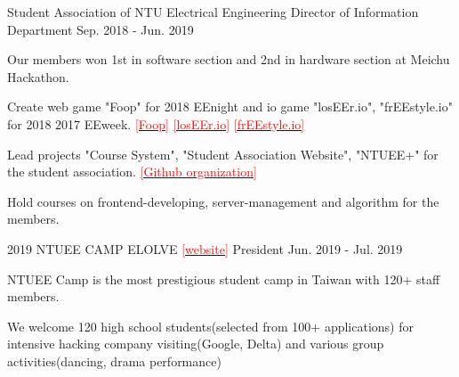 

\begin{cventries}

  \cventry
    {Student Association of NTU Electrical Engineering} %
    {Director of Information Department} %
    {} %
    {Sep. 2018 - Jun. 2019} %
    {
      \begin{cvitems} %
        \item {Our members won 1st in software section and 2nd in hardware section at Meichu Hackathon.}
        \item {Create web game "Foop" for 2018 EEnight and io game "losEEr.io", "frEEstyle.io" for 2018 2017 EEweek.} \href{https://github.com/ByronHsu/Foop}{\textcolor{red}{[Foop]}} \href{https://github.com/ByronHsu/losEEr.io}{\textcolor{red}{[losEEr.io]}} \href{https://github.com/HowardMHJuan/2017EEweek}{\textcolor{red}{[frEEstyle.io]}}
        \item {Lead projects "Course System", "Student Association Website", "NTUEE+" for the student association.} \href{https://github.com/NTUEEInfoDep}{\textcolor{red}{[Github organization]}}
        \item {Hold courses on frontend-developing, server-management and algorithm for the members.}
      \end{cvitems}
    }

  \cventry
    {2019 NTUEE CAMP ELOLVE \href{https://byronhsu.github.io/2019eecamp/}{\textcolor{red}{[website]}}} %
    {President} %
    {} %
    {Jun. 2019 - Jul. 2019} %
    {
      \begin{cvitems} %
        \item {NTUEE Camp is the most prestigious student camp in Taiwan with 120+ staff members.}
        \item {We welcome 120 high school students(selected from 100+ applications) for intensive hacking company visiting(Google, Delta) and various group activities(dancing, drama performance)}
      \end{cvitems}
    }
\end{cventries}

